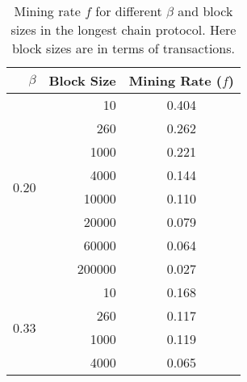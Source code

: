 \begin{table}[t]
	\centering
	\caption{Mining rate $f$ for different $\beta$ and block sizes in the longest chain protocol. Here block sizes are in terms of transactions.}
	\begin{tabular}{ r | r | c } 
	 \hline
	 $\beta$ & Block Size & Mining Rate ($f$) \\ [0.5ex] 
	 \hline\hline
	 \multirow{8}{*}{0.20} & 10 & 0.404 \\
	                       & 260 & 0.262 \\
	                       & 1000 & 0.221 \\
	                       & 4000 & 0.144 \\
	                       & 10000 & 0.110 \\
	                       & 20000 & 0.079 \\
	                       & 60000 & 0.064 \\
	                       & 200000 & 0.027 \\
	 \hline
	 \multirow{4}{*}{0.33} & 10 & 0.168 \\
	                       & 260 & 0.117 \\
	                       & 1000 & 0.119 \\
	                       & 4000 & 0.065 \\
	 \hline
	\end{tabular}
\label{table:lc-params}
\end{table}




